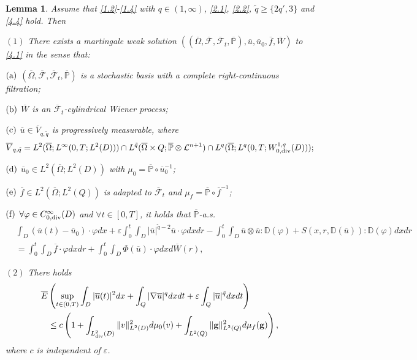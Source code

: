 \documentclass[reqno]{amsart}
\newtheorem{Lemma}[Theorem]{Lemma}
\theoremstyle{definition}
\theoremstyle{remark}
\numberwithin{equation}{section} \allowdisplaybreaks
\begin{document}
\begin{Lemma}
Assume that \eqref{1.2}-\eqref{1.4} with $q\in (1,\infty)$,
\eqref{2.1}, \eqref{2.2}, $\tilde{q}\geq\{2q',3\}$ and \eqref{4.4}
hold. Then

 $(1)$ There exists a martingale weak solution
$((\overline{\Omega},\overline{\mathscr{F}},\overline{\mathscr{F}}_t,\overline{\mathbb{P}}),\overline{u},\overline{u}_0,\overline{f},\overline{W})$
to \eqref{4.1} in the sense that:

 $(\rm a)$
$(\overline{\Omega},\overline{\mathscr{F}},\overline{\mathscr{F}}_t,\overline{\mathbb{P}})$
is a stochastic basis with a complete right-continuous filtration;

$(\rm b)$ $\overline{W}$ is an
$\overline{\mathscr{F}}_t$-cylindrical Wiener process;

$(\rm c)$ $\overline{u}\in \overline{V}_{q,\tilde{q}}$ is
progressively measurable, where
$$\overline{V}_{q,\tilde{q}}=L^2(\overline{\Omega};L^\infty(0,T;L^2(D)))\cap L^{\tilde{q}}
(\overline{\Omega}\times Q; \overline{\mathbb{P}}\otimes
\mathcal{L}^{n+1})\cap L^q
(\overline{\Omega};L^q(0,T;W_{0,\rm{div}}^{1,q}(D)));$$

$(\rm d)$ $\overline{u}_0\in L^2(\overline{\Omega}; L^{2}(D))$ with
$\mu_0=\overline{\mathbb{P}}\circ \overline{u}_0^{-1}$;

$(\rm e)$ $\overline{f}\in L^2(\overline{\Omega}; L^{2}(Q))$ is
adapted to $\overline{\mathscr{F}}_t$ and
$\mu_f=\overline{\mathbb{P}}\circ \overline{f}^{-1}$;

$(\rm f )$ $\forall \varphi\in C_{0,\rm{div}}^{\infty}(D)$ and
$\forall t\in [0,T]$, it holds that $\overline{\mathbb{P}}$-a.s.
\begin{equation*}
\begin{split}
&\int_{D}\!(\overline{u}(t)\!-\!\overline{u}_0)\cdot\varphi
dx\!+\!\varepsilon\!\!\int_0^t\!\!\!\int_{D}|\overline{u}|^{\tilde{q}-2}\overline{u}\cdot\varphi
dxdr\!-\!\!\int_0^t\!\!\!\int_{D}\overline{u}\otimes \overline{u}
:\mathbb{D}(\varphi)\!+\!S(x,r,\mathbb{D}(\overline{u})):\mathbb{D}(\varphi)
dxdr\\
&=\int_0^t\!\!\!\int_{D}\overline{f}\cdot \varphi dx dr
+\int_0^t\!\!\!\int_{D}\Phi(\overline{u})\cdot \varphi
dxd\overline{W}(r),
\end{split}
\end{equation*}

$(2)$ There holds
\begin{equation*}
\begin{split}
\overline{E}&\left(\sup_{t\in(0,T)}\int_{D}|\overline{u}(t)|^2dx+\int_Q|\nabla \overline{u}|^qdxdt+\varepsilon\int_Q|\overline{u}|^{\tilde{q}}dxdt\right)\\
&\leq
c\left(1+\int_{L^2_{\rm{div}}(D)}\|v\|^2_{L^2(D)}d\mu_0(v)+\int_{L^2(Q)}\|\mathbf{g}\|^2_{L^2(Q)}d\mu_f(\mathbf{g})\right),
\end{split}
\end{equation*}
where $c$ is independent of $\varepsilon$.
\end{Lemma}
\end{document}
